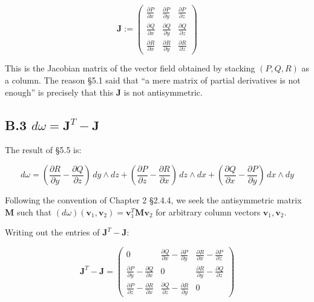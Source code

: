 \documentclass[a4paper,12pt,openany]{book}
\begin{document}
\[\mathbf{J} := \begin{pmatrix}
\frac{\partial P}{\partial x} & \frac{\partial P}{\partial y} & \frac{\partial P}{\partial z} \\
\frac{\partial Q}{\partial x} & \frac{\partial Q}{\partial y} & \frac{\partial Q}{\partial z} \\
\frac{\partial R}{\partial x} & \frac{\partial R}{\partial y} & \frac{\partial R}{\partial z}
\end{pmatrix}\]

This is the Jacobian matrix of the vector field obtained by stacking
\((P,Q,R)\) as a column. The reason §5.1 said that ``a mere matrix of
partial derivatives is not enough'' is precisely that this
\(\mathbf{J}\) is not antisymmetric.

\hypertarget{b.3-domega-mathbfjt—mathbfj}{%
\subsection*{\texorpdfstring{B.3
\(d\omega = \mathbf{J}^T - \mathbf{J}\)}{B.3 d\textbackslash omega = \textbackslash mathbf\{J\}\^{}T - \textbackslash mathbf\{J\}}}\label{b.3-domega-mathbfjt—mathbfj}}

The result of §5.5 is:

\[d\omega = (\frac{\partial R}{\partial y} - \frac{\partial Q}{\partial z})\,dy \wedge dz + (\frac{\partial P}{\partial z} - \frac{\partial R}{\partial x})\,dz \wedge dx + (\frac{\partial Q}{\partial x} - \frac{\partial P}{\partial y})\,dx \wedge dy\]

Following the convention of Chapter 2 §2.4.4, we seek the antisymmetric
matrix \(\mathbf{M}\) such that
\((d\omega)(\mathbf{v}_1, \mathbf{v}_2) = \mathbf{v}_1^T \mathbf{M} \mathbf{v}_2\)
for arbitrary column vectors \(\mathbf{v}_1, \mathbf{v}_2\).

Writing out the entries of \(\mathbf{J}^T - \mathbf{J}\):

\[\mathbf{J}^T - \mathbf{J} = \begin{pmatrix}
0 & \frac{\partial Q}{\partial x} - \frac{\partial P}{\partial y} & \frac{\partial R}{\partial x} - \frac{\partial P}{\partial z} \\
\frac{\partial P}{\partial y} - \frac{\partial Q}{\partial x} & 0 & \frac{\partial R}{\partial y} - \frac{\partial Q}{\partial z} \\
\frac{\partial P}{\partial z} - \frac{\partial R}{\partial x} & \frac{\partial Q}{\partial z} - \frac{\partial R}{\partial y} & 0
\end{pmatrix}\]
\end{document}
